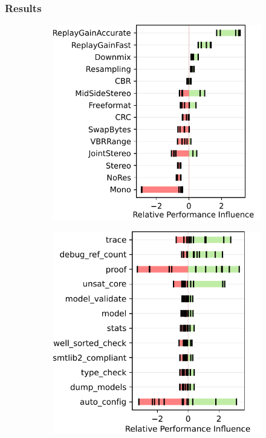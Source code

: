 {{{\subsubsection{Results}\label{sec:results2}

\begin{figure}
	\centering
	\begin{subfigure}{0.29\linewidth}
		\centering
		\includegraphics[width=\linewidth]{images/jump3r.pdf}
		\caption{\jumper}
		\label{fig:overview_jump3r}
	\end{subfigure}
	\begin{subfigure}{0.29\linewidth}
		\centering
		\includegraphics[width=\linewidth]{images/z3.pdf}

\end{subfigure}
\end{figure}}}}
